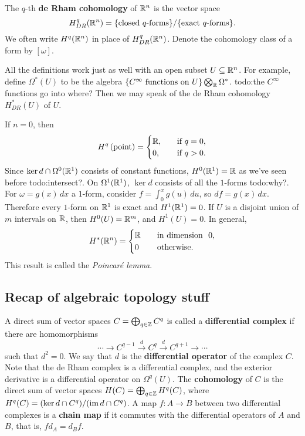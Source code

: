 \begin{definition}[]
    The $q$-th \textbf{de Rham cohomology} of $\mathbb{R}^n $ is the vector space \[
        H_{DR}^q (\R^n )= \{\text{closed} \ q\text{-forms}\} / \{\text{exact} \ q\text{-forms}  \} .
    \] We often write $H^q(\mathbb{R}^n )$ in place of $H_{DR}^q(\mathbb{R}^n )$. Denote the cohomology class of a form by $[\omega]$.
\end{definition}
All the definitions work just as well with an open subset $U\subseteq \mathbb{R}^n $. For example, define $\Omega^*(U)$ to be the algebra $\{C^{\infty} \ \text{functions on} \ U\} \bigotimes _{\R}\Omega^*$. {\color{red}todo:the $C^{\infty}$ functions go into where?} Then we may speak of the de Rham cohomology $H_{DR}^*(U)$ of $U$.
\begin{example}
    If $n=0$, then \[
        H^q \left( \text{point}   \right) =
    \begin{cases}
        \mathbb{R},\quad &\text{if} \ q=0,\\
        0,& \text{if} \ q>0.
    \end{cases}
\] Since $\ker d \cap \Omega^0(\mathbb{R}^1)$ consists of constant functions, $H^0(\mathbb{R}^1)=\mathbb{R}$ as we've seen before {\color{red}todo:intersect?}.  On $\Omega^1(\mathbb{R}^1)$, $\ker d$ consists of all the $1$-forms {\color{red}todo:why?}. For $\omega=g(x)\,dx$ a $1$-form, consider $f= \int_{0}^{x} g(u) \, du$, so $df=g(x)\,dx$. Therefore every $1$-form on $\mathbb{R}^1$ is exact and $H^1(\mathbb{R}^1)=0$. If $U$ is a disjoint union of $m$ intervals on $\mathbb{R}$, then $H^0(U)=\mathbb{R}^m$, and $H^1(U)=0$. In general, 
\[
    H^*(\mathbb{R}^n )=
    \begin{cases}
        \mathbb{R}\quad& \text{in dimension } \ 0,\\
        0 & \text{otherwise.} 
    \end{cases}
\] This result is called the \emph{Poincar\'e lemma}.
\end{example}

\subsection{Recap of algebraic topology stuff}
A direct sum of vector spaces $C=\bigoplus_{q\in \mathbb{Z}}C^q$ is called a \textbf{differential complex} if there are homomorphisms \[
    \cdots \to C^{q-1}\overset{d}{\to } C^q \overset{d}{\to } C^{q+1}\to \cdots 
\] such that $d^2=0$. We say that $d$ is the \textbf{differential operator} of the complex $C$. Note that the de Rham complex is a differential complex, and the exterior derivative is a differential operator on  $\Omega^q(U)$. The \textbf{cohomology} of $C$ is the direct sum of vector spaces $H(C)=\bigoplus_{q\in \mathbb{Z}}H^q(C)$, where $H^q(C)=(\ker d \cap C^q) / (\operatorname{im} d \cap C^q)$. A map $f \colon A \to B$ between two differential complexes is a \textbf{chain map} if it commutes with the differential operators of $A$ and $B$, that is, $f d_A=d_Bf$. 

